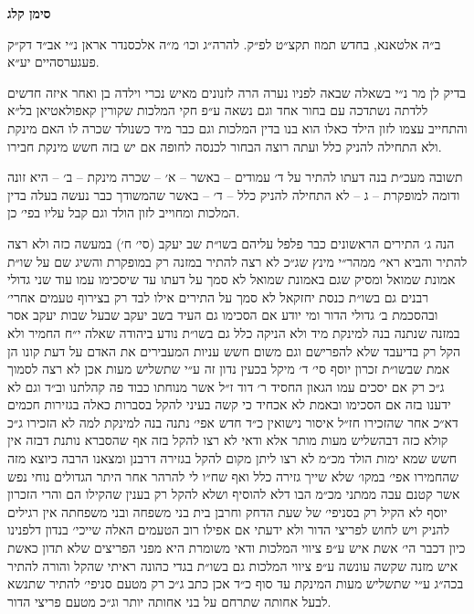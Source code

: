 \documentclass[12pt, openany]{book}
\newcommand{\chapname}{}
\newcommand{\newchap}[1]{
	\addcontentsline{toc}{chapter}{#1}
	\renewcommand{\chapname}{#1}
		\begin{center}
			\textbf{%
\fontsize{16pt}{16pt}\selectfont
				#1}
		\end{center}
}
\begin{document}
\newchap{סימן קלג}
\begin{multicols}{2}
ב״ה אלטאנא, בחדש תמוז תקצ״ט לפ״ק. להרה״ג וכו׳ מ״ה אלכסנדר אראן נ״י אב״ד דק״ק פעגערסהיים יע״א.\\\vspace{0pt}

בדיק לן מר נ״י בשאלה שבאה לפניו נערה הרה לזנונים מאיש נכרי וילדה בן ואחר איזה חדשים ללדתה נשתדכה עם בחור אחד וגם נשאה ע״פ חקי המלכות שקורין קאפולאטיאן בל״א והתחייב עצמו לזון הילד כאלו הוא בנו בדין המלכות וגם כבר מיד כשנולד שכרה לו האם מינקת ולא התחילה להניק כלל ועתה רוצה הבחור לכנסה לחופה אם יש בזה חשש מינקת חבירו.\\\vspace{0pt}

תשובה מעכ״ת בנה דעתו להתיר על ד׳ עמודים – באשר – א׳ – שכרה מינקת – ב׳ – היא זונה ודומה למופקרת – ג – לא התחילה להניק כלל – ד׳ – באשר שהמשודך כבר נעשה בעלה בדין המלכות ומחוייב לזון הולד וגם קבל עליו בפי׳ כן.\\\vspace{0pt}

הנה ג׳ התירים הראשונים כבר פלפל עליהם בשו״ת שב יעקב (סי׳ ח׳) במעשה כזה ולא רצה להתיר והביא ראי׳ ממהר״י מינץ שג״כ לא רצה להתיר במזנה רק במופקרת והשיג שם על שו״ת אמונת שמואל ומסיק שגם באמונת שמואל לא סמך על דעתו עד שיסכימו עמו עוד שני גדולי רבנים גם בשו״ת כנסת יחזקאל לא סמך על התירים אילו לבד רק בצירוף טעמים אחרי׳ ובהסכמת ב׳ גדולי הדור ומי יודע אם הסכימו גם העיד בשב יעקב שבעל שבות יעקב אסר במזנה שנתנה בנה למינקת מיד ולא הניקה כלל גם בשו״ת נודע ביהודה שאלה י״ח החמיר ולא הקל רק בדיעבד שלא להפרישם וגם משום חשש עניות המעבירים את האדם על דעת קונו הן אמת שבשו״ת זכרון יוסף סי׳ ד׳ מיקל בכעין נדון זה ע״י שתשליש מעות אכן לא רצה לסמוך ג״כ רק אם יסכים עמו הגאון החסיד ר׳ דוד ז״ל אשר מנוחתו כבוד פה קהלתנו וב״ד וגם לא ידענו בזה אם הסכימו ובאמת לא אכחיד כי קשה בעיני להקל בסברות כאלה בגזירות חכמים דא״כ אחר שהזכירו חז״ל איסור נישואין כ״ד חדש אפי׳ נתנה בנה למינקת למה לא הזכירו ג״כ קולא כזה דבהשליש מעות מותר אלא ודאי לא רצו להקל בזה אף שהסברא נותנת דבזה אין חשש שמא ימות הולד מכ״מ לא רצו ליתן מקום להקל בגזירה דרבנן ומצאנו הרבה כיוצא מזה שהחמירו אפי׳ במקו׳ שלא שייך גזירה כלל ואף שח״ו לי להרהר אחר היתר הגדולים נוחי נפש אשר קטנם עבה ממתני מכ״מ הבו דלא להוסיף ושלא להקל רק בענין שהקילו הם והרי הזכרון יוסף לא הקיל רק בסניפי׳ של שעת הדחק וחרבן בית בני משפחה ובני משפחתה אין רגילים להניק ויש לחוש לפריצי הדור ולא ידעתי אם אפילו רוב הטעמים האלה שייכי׳ בנדון דלפנינו כיון דכבר הי׳ אשת איש ע״פ ציווי המלכות ודאי משומרת היא מפני הפריצים שלא תדון כאשת איש מזנה שקשה עונשה ע״פ ציווי המלכות גם בשו״ת בגדי כהונה ראיתי שהקל והורה להתיר בכה״ג ע״י שתשליש מעות המינקת עד סוף כ״ד אכן כתב ג״כ רק מטעם סניפי׳ להתיר שתנשא לבעל אחותה שתרחם על בני אחותה יותר וג״כ מטעם פריצי הדור.\\\vspace{0pt}


\end{multicols}
\end{document}
